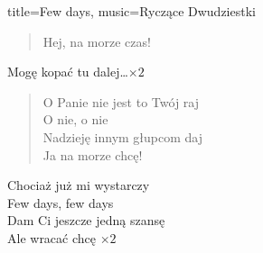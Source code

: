 \begin{song}{title={Few days}, music={Ryczące Dwudziestki}}
\begin{multicols}{2}
\begin{verse}
		Hej, na morze czas!
    \end{verse}
    \begin{chorus}
        Mogę kopać tu dalej\ldots $\times 2$ 
    \end{chorus}
    \begin{verse}
        O Panie nie jest to Twój raj \\
		O nie, o nie \\
		Nadzieję innym głupcom daj \\
		Ja na morze chcę!
    \end{verse}
    \begin{chorus}
        Chociaż już mi wystarczy \\
		Few days, few days \\
		Dam Ci jeszcze jedną szansę \\
		Ale wracać chcę $\times 2$ 
    \end{chorus}
    \end{multicols}
\end{song}

